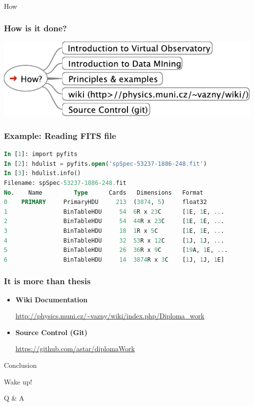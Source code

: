 \documentclass[fleqn]{beamer}
\begin{document}
\begin{section}{How}
  \begin{frame}\frametitle{How is it done?}
  \begin{center}
    \includegraphics[width=1.0\textwidth]{how}    
  \end{center}
\end{frame}

\begin{frame}[containsverbatim]\frametitle{Example: Reading FITS file}
\begin{lstlisting}[language=SQL]
In [1]: import pyfits
In [2]: hdulist = pyfits.open('spSpec-53237-1886-248.fit')
In [3]: hdulist.info()
Filename: spSpec-53237-1886-248.fit
No.    Name         Type      Cards   Dimensions   Format
0    PRIMARY     PrimaryHDU     213  (3874, 5)     float32
1                BinTableHDU     54  6R x 23C      [1E, 1E, ...
2                BinTableHDU     54  44R x 23C     [1E, 1E, ...
3                BinTableHDU     18  1R x 5C       [1E, 1E, ...
4                BinTableHDU     32  53R x 12C     [1J, 1J, ...
5                BinTableHDU     26  36R x 9C      [19A, 1E, ...
6                BinTableHDU     14  3874R x 3C    [1J, 1J, 1E]
\end{lstlisting}
\end{frame}

\begin{frame}\frametitle{It is more than thesis}
  \begin{itemize}
  \item \textbf{Wiki Documentation}

    \url{http://physics.muni.cz/~vazny/wiki/index.php/Diploma_work}
  \item \textbf{Source Control (Git)}

    \url{https://github.com/astar/diplomaWork}

  \end{itemize}
\end{frame}
\end{section}


\begin{section}{Conclusion}
\begin{frame}
  \begin{center}
 \huge{Wake up!}

 \bigskip

 \huge Q \& A    
  \end{center}
\end{frame}
\end{section}
\end{document}
